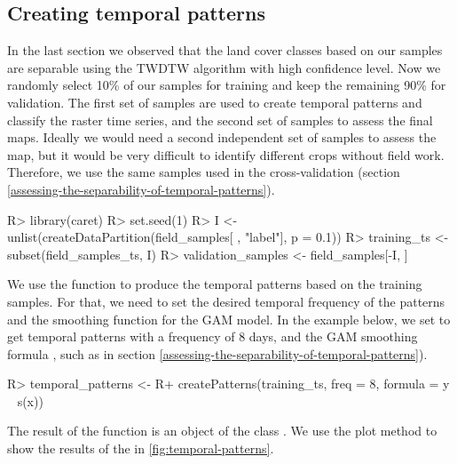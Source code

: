 \documentclass[article,shortnames]{jss}
\begin{document}
\hypertarget{creating-temporal-patterns}{%
\subsection{Creating temporal
patterns}\label{creating-temporal-patterns}}

In the last section we observed that the land cover classes based on our
samples are separable using the TWDTW algorithm with high confidence
level. Now we randomly select 10\% of our samples for training and keep
the remaining 90\% for validation. The first set of samples are used to
create temporal patterns and classify the raster time series, and the
second set of samples to assess the final maps. Ideally we would need a
second independent set of samples to assess the map, but it would be
very difficult to identify different crops without field work.
Therefore, we use the same samples used in the cross-validation (section
\ref{assessing-the-separability-of-temporal-patterns}).

\begin{CodeChunk}

\begin{CodeInput}
R> library(caret) 
R> set.seed(1)
R> I <- unlist(createDataPartition(field_samples[ , "label"], p = 0.1))
R> training_ts <- subset(field_samples_ts, I)
R> validation_samples <- field_samples[-I, ]
\end{CodeInput}
\end{CodeChunk}

We use the function  to produce the temporal
patterns based on the training samples. For that, we need to set the
desired temporal frequency of the patterns and the smoothing function
for the GAM model. In the example below, we set  to get
temporal patterns with a frequency of 8 days, and the GAM smoothing
formula , such as in section
\ref{assessing-the-separability-of-temporal-patterns}).

\begin{CodeChunk}

\begin{CodeInput}
R> temporal_patterns <- 
R+   createPatterns(training_ts, freq = 8, formula = y ~ s(x))
\end{CodeInput}
\end{CodeChunk}

The result of the function  is an object of the
class . We use the plot method
 to show the results of the
 in \autoref{fig:temporal-patterns}.
\end{document}
